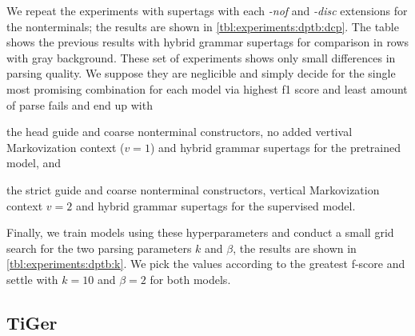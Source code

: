 \documentclass[../../document.tex]{subfiles}
\begin{document}
    We repeat the experiments with  supertags with each \emph{-nof} and \emph{-disc} extensions for the nonterminals; the results are shown in \cref{tbl:experiments:dptb:dcp}.
    The table shows the previous results with hybrid grammar supertags for comparison in rows with gray background.
    These set of experiments shows only small differences in parsing quality.
    We suppose they are neglicible and simply decide for the single most promising combination for each model via highest f1 score and least amount of parse fails and end up with
    \begin{compactitem}
        \item the head guide and coarse nonterminal constructors, no added vertival Markovization context ($v=1$) and hybrid grammar supertags for the pretrained model, and
        \item the strict guide and coarse nonterminal constructors, vertical Markovization context \(v=2\) and hybrid grammar supertags for the supervised model.
    \end{compactitem}
    Finally, we train models using these hyperparameters and conduct a small grid search for the two parsing parameters \(k\) and \(\beta\), the results are shown in \cref{tbl:experiments:dptb:k}.
    We pick the values according to the greatest f-score and settle with \(k=10\) and \(\beta=2\) for both models.

    \subsection{TiGer}
    

\end{document}
